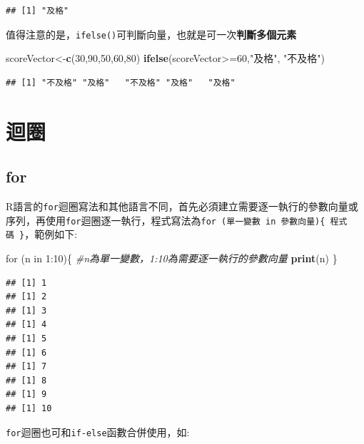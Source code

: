 \documentclass[]{book}
\newenvironment{Shaded}{\begin{snugshade}}{\end{snugshade}}
\newcommand{\KeywordTok}[1]{\textcolor[rgb]{0.13,0.29,0.53}{\textbf{{#1}}}}
\newcommand{\DecValTok}[1]{\textcolor[rgb]{0.00,0.00,0.81}{{#1}}}
\newcommand{\StringTok}[1]{\textcolor[rgb]{0.31,0.60,0.02}{{#1}}}
\newcommand{\CommentTok}[1]{\textcolor[rgb]{0.56,0.35,0.01}{\textit{{#1}}}}
\newcommand{\NormalTok}[1]{{#1}}
\theoremstyle{definition}
\theoremstyle{definition}
\theoremstyle{remark}
\begin{document}
\begin{verbatim}
## [1] "及格"
\end{verbatim}

值得注意的是，\texttt{ifelse()}可判斷向量，也就是可一次\textbf{判斷多個元素}

\begin{Shaded}
\begin{Highlighting}[]
\NormalTok{scoreVector<-}\KeywordTok{c}\NormalTok{(}\DecValTok{30}\NormalTok{,}\DecValTok{90}\NormalTok{,}\DecValTok{50}\NormalTok{,}\DecValTok{60}\NormalTok{,}\DecValTok{80}\NormalTok{)}
\KeywordTok{ifelse}\NormalTok{(scoreVector>=}\DecValTok{60}\NormalTok{,}\StringTok{"及格"}\NormalTok{, }\StringTok{"不及格"}\NormalTok{)}
\end{Highlighting}
\end{Shaded}

\begin{verbatim}
## [1] "不及格" "及格"   "不及格" "及格"   "及格"
\end{verbatim}

\section{迴圈}

\subsection{for}\label{for}

R語言的\texttt{for}迴圈寫法和其他語言不同，首先必須建立需要逐一執行的參數向量或序列，再使用\texttt{for}迴圈逐一執行，程式寫法為\texttt{for\ (單一變數\ in\ 參數向量)\{\ 程式碼\ \}}，範例如下:

\begin{Shaded}
\begin{Highlighting}[]
\NormalTok{for (n in }\DecValTok{1}\NormalTok{:}\DecValTok{10}\NormalTok{)\{ }\CommentTok{#n為單一變數，1:10為需要逐一執行的參數向量}
  \KeywordTok{print}\NormalTok{(n)}
\NormalTok{\}}
\end{Highlighting}
\end{Shaded}

\begin{verbatim}
## [1] 1
## [1] 2
## [1] 3
## [1] 4
## [1] 5
## [1] 6
## [1] 7
## [1] 8
## [1] 9
## [1] 10
\end{verbatim}

\texttt{for}迴圈也可和\texttt{if-else}函數合併使用，如:

\begin{Shaded}
\end{Shaded}
\end{document}
